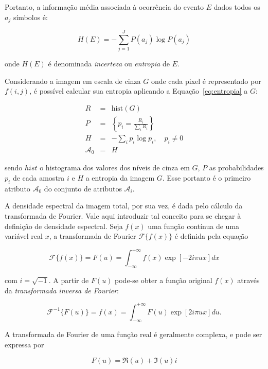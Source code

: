 Portanto, a informação média associada à ocorrência do evento $E$
dados todos os $a_j$ símbolos é:

\begin{equation}
  H(E) =  -\sum_{j=1}^J P(a_j) \log P(a_j)
  \label{eq:entropia}
\end{equation} 

\noindent onde $H(E)$ é denominada \emph{incerteza} ou \emph{entropia} de $E$.

Considerando a imagem em escala de cinza $G$ onde cada pixel é
representado por $f(i,j)$, é possível calcular sua entropia aplicando
a Equação~\ref{eq:entropia} a $G$:

\begin{eqnarray}
  R & = & \text{hist}(G) \\
  P & = & \left\{ p_i = \frac{R_i}{\sum_{i} R_i} \right\}\\
  H & = & -\sum_i p_i \log p_i, \,\,\,\,\,\, p_i \neq 0 \\
  \mathcal{A}_0 & = & H
\end{eqnarray}

\noindent sendo $hist$ o histograma dos valores dos níveis de cinza em
$G$, $P$ as probabilidades $p_i$ de cada amostra $i$ e $H$ a entropia
da imagem $G$. Esse portanto é o primeiro atributo $\mathcal{A}_0$ do
conjunto de atributos $\mathcal{A}_i$.

A densidade espectral da imagem total, por sua vez, é dada pelo
cálculo da transformada de Fourier. Vale aqui introduzir tal conceito
para se chegar à definição de densidade espectral. Seja $f(x)$ uma
função contínua de uma variável real $x$, a transformada de Fourier
$\mathcal{F}\{f(x)\}$ é definida pela equação

\begin{equation}
  \mathcal{F}\{f(x)\} = F(u) = \int_{-\infty}^{+\infty} f(x) \exp[-2i\pi u x] dx
\end{equation}

\noindent com $i = \sqrt{-1}$. A partir de $F(u)$ pode-se obter a função
original $f(x)$ através da \emph{transformada inversa de Fourier}:

\begin{equation}
  \mathcal{F}^{-1}\{F(u)\} = f(x) = \int_{-\infty}^{+\infty} F(u) \exp[2i\pi u x] du.
\end{equation}

A transformada de Fourier de uma função real é geralmente complexa, e pode ser
expressa por

\begin{equation}
  F(u) = \Re(u) + \Im(u)i
  \label{eq:fourier_complexa}
\end{equation}

